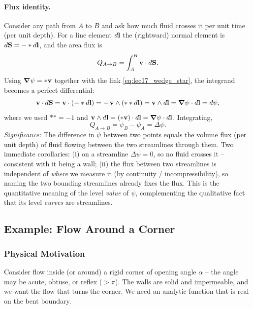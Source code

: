 \documentclass[../main.tex]{subfiles}
\begin{document}
\paragraph{Flux identity.} Consider any path from $A$ to $B$ and ask how much fluid crosses it per unit time (per unit depth). For a line element $d\mathbf{l}$ the (rightward) normal element is $d\mathbf{S}=-\ast d\mathbf{l}$, and the area flux is
\begin{equation}
  Q_{A\to B} = \int_A^B \mathbf{v}\cdot d\mathbf{S} .
  \label{eq:lec17_flux_def}
\end{equation}
Using $\grad\psi=\ast\mathbf{v}$ together with the link \eqref{eq:lec17_wedge_star}, the integrand becomes a perfect differential:
\begin{equation}
  \mathbf{v}\cdot d\mathbf{S} = \mathbf{v}\cdot(-\ast d\mathbf{l}) = -\,\mathbf{v}\wedge(\ast\ast d\mathbf{l}) = \mathbf{v}\wedge d\mathbf{l} = \grad\psi\cdot d\mathbf{l} = d\psi,
  \label{eq:lec17_flux_dpsi}
\end{equation}
where we used $\ast\ast=-1$ and $\mathbf{v}\wedge d\mathbf{l}=(\ast\mathbf{v})\cdot d\mathbf{l}=\grad\psi\cdot d\mathbf{l}$. Integrating,
\begin{equation}
  \boxed{Q_{A\to B} = \psi_B - \psi_A = \Delta\psi.}
  \label{eq:lec17_flux_identity}
\end{equation}
\textit{Significance:} The difference in $\psi$ between two points equals the volume flux (per unit depth) of fluid flowing between the two streamlines through them. Two immediate corollaries: (i) on a streamline $\Delta\psi=0$, so no fluid crosses it -- consistent with it being a wall; (ii) the flux between two streamlines is independent of \emph{where} we measure it (by continuity / incompressibility), so naming the two bounding streamlines already fixes the flux. This is the quantitative meaning of the level \emph{value} of $\psi$, complementing the qualitative fact that its level \emph{curves} are streamlines.

\subsection{Example: Flow Around a Corner}\label{sec:lec17:corner}

\subsubsection*{Physical Motivation}
Consider flow inside (or around) a rigid corner of opening angle $\alpha$ -- the angle may be acute, obtuse, or reflex ($>\pi$). The walls are solid and impermeable, and we want the flow that turns the corner. We need an analytic function that is real on the bent boundary.
\end{document}
